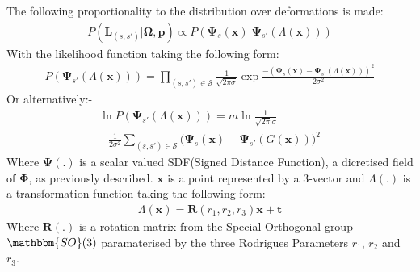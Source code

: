 The following proportionality to the distribution over deformations is made:
\begin{equation}
\begin{split}
P(\bm{L}_{(s, s')} | \bm{\Omega}, \bm{p}) \propto P(\bm{\Psi}_{s}(\bm{x}) | \bm{\Psi}_{s'}(\Lambda(\bm{x})))
\end{split}
\end{equation}
With the likelihood function taking the following form:
\begin{equation}
\begin{split}
P(\bm{\Psi}_{s'}(\Lambda(\bm{x}))) = \prod_{(s, s') \in \mathcal{S}} \frac{1}{\sqrt{2 \pi \sigma}} \exp{\frac{-(\bm{\Psi}_{s}(\bm{x}) - \bm{\Psi}_{s'}(\Lambda(\bm{x})))^2}{2\sigma^2}}
\end{split}
\end{equation}
Or alternatively:-
\begin{equation}
\begin{split}
\ln P(\bm{\Psi}_{s'}(\Lambda(\bm{x}))) = m\ln\frac{1}{\sqrt{2\pi}\sigma}\\
-\frac{1}{2\sigma^2} \sum_{(s, s') \in \mathcal{S}} \bigg( \bm{\Psi}_{s}(\bm{x}) - \bm{\Psi}_{s'}(G(\bm{x})) \bigg)^2
\end{split}
\end{equation}
Where $\bm{\Psi}(.)$ is a scalar valued SDF(Signed Distance Function), a dicretised field of $\bm{\Phi}$, as previously described. $\bm{x}$ is a point represented by a 3-vector and $\Lambda(.)$ is a transformation function taking the following form:
\begin{equation}
\begin{split}
\Lambda(\bm{x}) = \bm{R}(r_{1}, r_{2}, r_{3})\bm{x} + \bm{t}
\end{split}
\end{equation}
Where $\bm{R}(.)$ is a rotation matrix from the Special Orthogonal group $\mathbbm{SO}(3)$ paramaterised by the three 
Rodrigues Parameters\cite{Shuster1993} $r_{1}$, $r_{2}$ and $r_{3}$.

